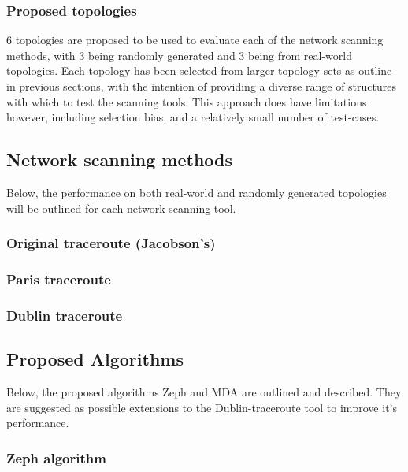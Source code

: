 
\subsubsection{Proposed topologies}
6 topologies are proposed to be used to evaluate each of the network scanning methods, with 3 being randomly generated and 3 being from real-world topologies. Each topology has been selected from larger topology sets as outline in previous sections, with the intention of providing a diverse range of structures with which to test the scanning tools. This approach does have limitations however, including selection bias, and a relatively small number of test-cases. 


\subsection{Network scanning methods}
Below, the performance on both real-world and randomly generated topologies will be outlined for each network scanning tool. 

\subsubsection{Original traceroute (Jacobson's)}



\subsubsection{Paris traceroute}

\subsubsection{Dublin traceroute}

\subsection{Proposed Algorithms}
Below, the proposed algorithms Zeph and MDA are outlined and described. They are suggested as possible extensions to the Dublin-traceroute tool to improve it's performance.  

\subsubsection{Zeph algorithm}

